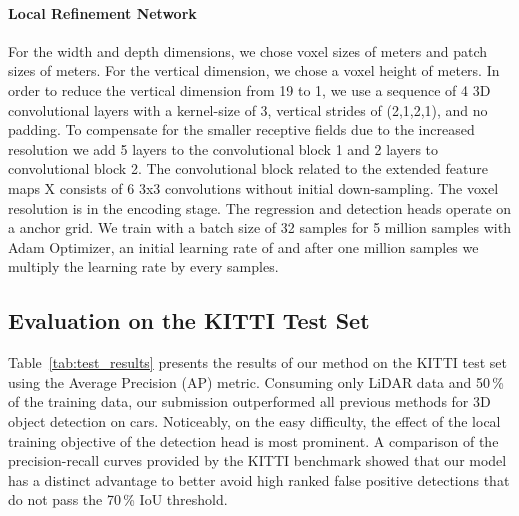 \documentclass{article}
\begin{document}
\paragraph{Local Refinement Network}
For the width  and depth  dimensions, we chose voxel sizes of  meters and patch sizes of  meters. For the vertical dimension, we chose a voxel height of  meters. In order to reduce the vertical dimension from 19 to 1, we use a sequence of 4 3D convolutional layers with a kernel-size of 3, vertical strides of (2,1,2,1), and no padding. To compensate for the smaller receptive fields due to the increased resolution we add 5 layers to the convolutional block 1 and 2 layers to convolutional block 2. The convolutional block related to the extended feature maps X  consists of 6 3x3 convolutions without initial down-sampling.
The voxel resolution is  in the encoding stage. The regression and detection heads operate on a  anchor grid. 
We train with a batch size of 32 samples for 5 million samples with Adam Optimizer, an initial learning rate of  and after one million samples we multiply the learning rate by  every  samples. 

\subsection{Evaluation on the KITTI Test Set}
Table~\ref{tab:test_results} presents the results of our method on the KITTI test set using the Average Precision (AP) metric. 
Consuming only LiDAR data and 50\,\% of the training data, our submission outperformed all previous methods for 3D object detection on cars. Noticeably, on the easy difficulty, the effect of the local training objective of the detection head is most prominent. A comparison of the precision-recall curves provided by the KITTI benchmark showed that our model has a distinct advantage to better avoid high ranked false positive detections that do not pass the 70\,\% IoU threshold.
\end{document}
